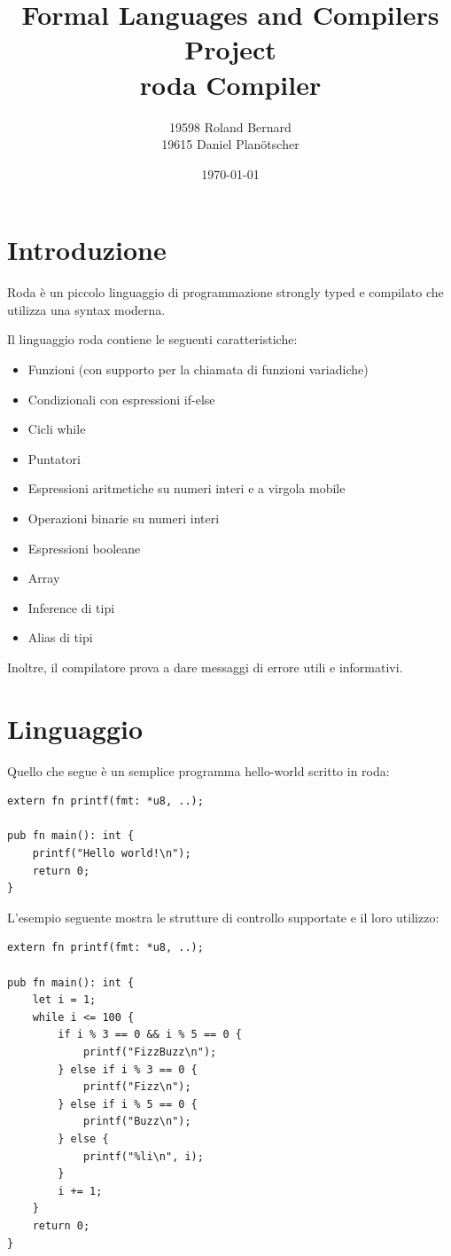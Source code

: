 \documentclass[a4paper]{article}
\title{
Formal Languages and Compilers \\
Project \\
roda Compiler
}
\author{
    19598 Roland Bernard \\
    19615 Daniel Planötscher
}
\date{\today}
\begin{document}
\maketitle

\section{Introduzione}

Roda è un piccolo linguaggio di programmazione strongly typed e compilato che utilizza una syntax moderna.

Il linguaggio roda contiene le seguenti caratteristiche:
\begin{itemize}
    \item Funzioni (con supporto per la chiamata di funzioni variadiche)
    \item Condizionali con espressioni if-else
    \item Cicli while
    \item Puntatori
    \item Espressioni aritmetiche su numeri interi e a virgola mobile
    \item Operazioni binarie su numeri interi
    \item Espressioni booleane
    \item Array
    \item Inference di tipi
    \item Alias di tipi
\end{itemize}

Inoltre, il compilatore prova a dare messaggi di errore utili e informativi.

\section{Linguaggio}

Quello che segue è un semplice programma hello-world scritto in roda:
\begin{verbatim}
extern fn printf(fmt: *u8, ..);

pub fn main(): int {
    printf("Hello world!\n");
    return 0;
}
\end{verbatim}

L'esempio seguente mostra le strutture di controllo supportate e il loro utilizzo:
\begin{verbatim}
extern fn printf(fmt: *u8, ..);

pub fn main(): int {
    let i = 1;
    while i <= 100 {
        if i % 3 == 0 && i % 5 == 0 {
            printf("FizzBuzz\n");
        } else if i % 3 == 0 {
            printf("Fizz\n");
        } else if i % 5 == 0 {
            printf("Buzz\n");
        } else {
            printf("%li\n", i);
        }
        i += 1;
    }
    return 0;
}
\end{verbatim}
\end{document}
